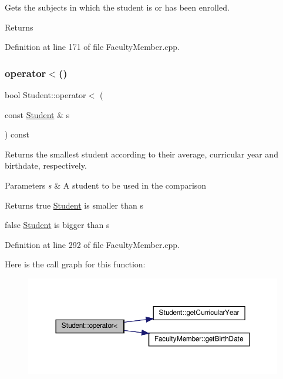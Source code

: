 Gets the subjects in which the student is or has been enrolled. \begin{DoxyReturn}{Returns}

\end{DoxyReturn}


Definition at line 171 of file Faculty\+Member.\+cpp.

\mbox{\label{classStudent_aabc24d469d7206a621fa154b3578d9e0}} 
\subsubsection{\texorpdfstring{operator$<$()}{operator<()}}
{\footnotesize\ttfamily bool Student\+::operator$<$ (\begin{DoxyParamCaption}\item[{const \hyperlink{classStudent}{Student} \&}]{s }\end{DoxyParamCaption}) const}



Returns the smallest student according to their average, curricular year and birthdate, respectively. 


\begin{DoxyParams}{Parameters}
{\em s} & A student to be used in the comparison \\
\hline
\end{DoxyParams}
\begin{DoxyReturn}{Returns}
true \hyperlink{classStudent}{Student} is smaller than s 

false \hyperlink{classStudent}{Student} is bigger than s 
\end{DoxyReturn}


Definition at line 292 of file Faculty\+Member.\+cpp.

Here is the call graph for this function\+:\nopagebreak
\begin{figure}[H]
\begin{center}
\leavevmode
\includegraphics[width=350pt]{classStudent_aabc24d469d7206a621fa154b3578d9e0_cgraph}
\end{center}
\end{figure}
\mbox{\label{classStudent_a3567f5c4220ffa88a8855998b3b99b43}} 
